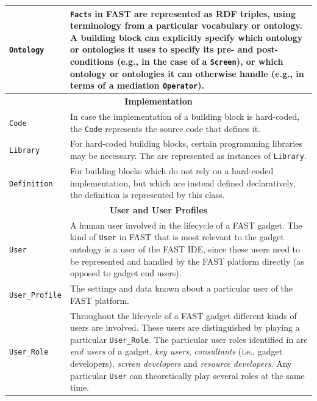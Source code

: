 \documentclass[twoside]{fast_latex}
\begin{document}
\begin{small}
\begin{longtable}{|p{4.25cm}|p{10cm}|}
\texttt{Ontology} & \texttt{Fact}s in FAST are represented as RDF triples, using terminology from a particular vocabulary or ontology. A building block can explicitly specify which ontology or ontologies it uses to specify its pre- and post-conditions (e.g., in the case of a \texttt{Screen}), or which ontology or ontologies it can otherwise handle (e.g., in terms of a mediation \texttt{Operator}). \\ \hline
\multicolumn{2}{|c|}{\textbf{Implementation}} \\ \hline
\texttt{Code} & In case the implementation of a building block is hard-coded, the \texttt{Code} represents the source code that defines it. \\ \hline
\texttt{Library} & For hard-coded building blocks, certain programming libraries may be necessary. The are represented as instances of \texttt{Library}. \\ \hline
\texttt{Definition} & For building blocks which do not rely on a hard-coded implementation, but which are instead defined declaratively, the definition is represented by this class. \\ \hline
\multicolumn{2}{|c|}{\textbf{User and User Profiles}} \\ \hline
\texttt{User} & A human user involved in the lifecycle of a FAST gadget. The kind of \texttt{User} in FAST that is most relevant to the gadget ontology is a user of the FAST IDE, since these users need to be represented and handled by the FAST platform directly (as opposed to gadget end users). \\ \hline
\texttt{User\_Profile} & The settings and data known about a particular user of the FAST platform. \\ \hline
\texttt{User\_Role} & Throughout the lifecycle of a FAST gadget different kinds of users are involved. These users are distinguished by playing a particular \texttt{User\_Role}. The particular user roles identified in \cite{villoslada2010fast_requirements} are \emph{end users} of a gadget, \emph{key users}, \emph{consultants} (i.e., gadget developers), \emph{screen developers} and \emph{resource developers}. Any particular \texttt{User} can theoretically play several roles at the same time. \\ \hline

\end{longtable}
\end{small}
\end{document}
